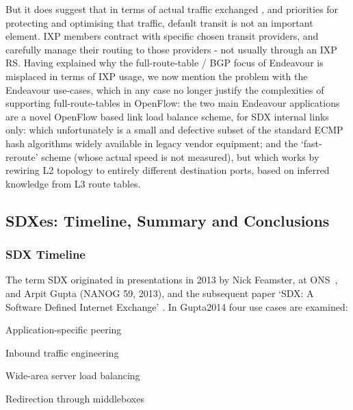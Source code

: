 But it does suggest that in terms of actual traffic exchanged , and priorities for protecting and optimising  that traffic, default transit is not an important element.
IXP members contract with specific chosen transit providers, and carefully manage their routing to those providers - not usually through an IXP RS.
Having explained why the full-route-table / BGP focus of Endeavour is misplaced in terms of IXP usage, we now mention the problem with the Endeavour use-cases, which in any case no longer justify the complexities of supporting full-route-tables in OpenFlow: the two main Endeavour applications are a novel OpenFlow based link load balance scheme, for SDX internal links only: which unfortunately is a small and defective subset of the standard ECMP hash algorithms widely available in legacy vendor equipment; and the `fast-reroute' scheme (whose actual speed is not measured), but which works by rewiring L2 topology to entirely different destination ports, based on inferred knowledge from L3 route tables.

\subsection{SDXes: Timeline, Summary and Conclusions}

\subsubsection{SDX Timeline}
The term SDX originated
in presentations in 2013 by Nick Feamster, at ONS~\cite{feamster2013}, and Arpit Gupta (NANOG 59, 2013), and the subsequent paper `SDX: A Software Defined Internet Exchange' \cite{Gupta2014}.
In Gupta2014 four use cases are examined:
\begin{myitemize}
    \item Application-specific peering
    \item Inbound traffic engineering
    \item Wide-area server load balancing
    \item Redirection through middleboxes
\end{myitemize}

